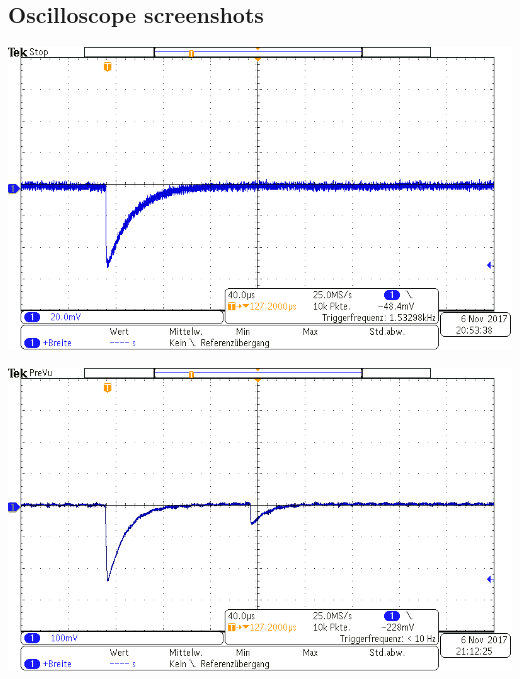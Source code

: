 \subsection{Oscilloscope screenshots}
%
\begin{center}
    \begin{adjustbox}{max width=\linewidth, keepaspectratio}
        \includegraphics[]{png/tek00000}
    \end{adjustbox}
    \label{fig:}
\end{center}
%
\begin{center}
    \begin{adjustbox}{max width=\linewidth, keepaspectratio}
        \includegraphics[]{png/tek00001}
    \end{adjustbox}
    \label{fig:}
\end{center}
%
